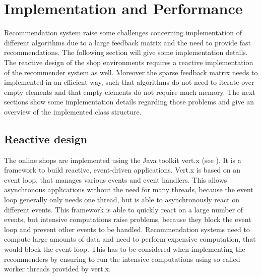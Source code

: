 \documentclass[10pt]{reportMaster}
\begin{document}
\chapter{Implementation and Performance}
\label{chap:ImplemenationAndPerformance}
Recommendation system raise some challenges concerning implementation of different algorithms due to a large feedback matrix and the need to provide fast recommendations.
The following section will give some implementation details. 
The reactive design of the shop environments requires a reactive implementation of the recommender system as well.
Moreover the sparse feedback matrix needs to implemented in an efficient way, such that algorithms do not need to iterate over empty elements and that empty elements do not require much memory.
The next sections show some implementation details regarding those problems and give an overview of the implemented class structure.

\section{Reactive design}
\label{sec:ReactiveDesign}
The online shops are implemented using the Java toolkit vert.x (see \cite{vertx}).
It is a framework to build reactive, event-driven applications.
Vert.x is based on an event loop, that manages various events and event handlers.
This allows asynchronous applications without the need for many threads, because the event loop generally only needs one thread, but is able to asynchronously react on different events.
This framework is able to quickly react on a large number of events, but intensive computations raise problems, because they block the event loop and prevent other events to be handled.
Recommendation systems need to compute large amounts of data and need to perform expensive computation, that would block the event loop.
This has to be considered when implementing the recommenders by ensuring to run the intensive computations using so called worker threads provided by vert.x.
\end{document}
